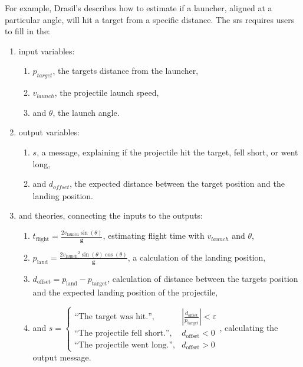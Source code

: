 For example, Drasil's 
describes how to estimate if a launcher, aligned at a particular angle, will hit
a target from a specific distance. The \acs{srs} requires users to fill in the:
\begin{enumerate}
    \item input variables:
          \begin{enumerate}
              \item \(p_\mathit{target}\), the targets distance from the
                    launcher,
              \item \(v_\mathit{launch}\), the projectile launch speed,
              \item and \(\theta\), the launch angle.
          \end{enumerate}
    \item output variables:
          \begin{enumerate}
              \item \(s\), a message, explaining if the projectile hit the
                    target, fell short, or went long,
              \item and \(d_\mathit{offset}\), the expected distance between the
                    target position and the landing position.
          \end{enumerate}
    \item and theories, connecting the inputs to the outputs:
          \begin{enumerate}
              \item \({t_{\text{flight}}}=\frac{2 {v_{\text{launch}}}
                        \sin\left(\theta{}\right)}{\mathbf{g}}\), estimating
                    flight time with \(v_{\mathit{launch}}\) and \(\theta\),
              \item \({p_{\text{land}}}=\frac{2 {v_{\text{launch}}}^{2}
                        \sin\left(\theta{}\right)
                        \cos\left(\theta{}\right)}{\mathbf{g}}\), a calculation
                    of the landing position,
              \item \({d_{\text{offset}}}={p_{\text{land}}}-{p_{\text{target}}}\),
                    calculation of distance between the targets position and the
                    expected landing position of the projectile,
              \item and \(s=\begin{cases} \text{``The target was hit.''},        &
              |\frac{{d_{\text{offset}}}}{{p_{\text{target}}}}| < \varepsilon{}
              \\
              \text{``The projectile fell short.''}, & {d_{\text{offset}}} < 0 \\
              \text{``The projectile went long.''},  & {d_{\text{offset}}} >
              0\end{cases}\), \newline{}calculating the output message.
          \end{enumerate}
\end{enumerate}

